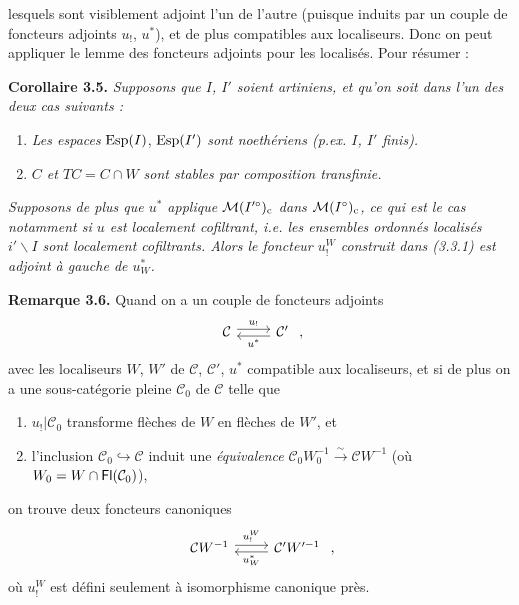 \dgrchunkbegin

lesquels sont visiblement adjoint l'un de l'autre (puisque induits par un couple de foncteurs %
adjoints $u_!$, $u^*$), et de plus compatibles aux localiseurs. Donc on peut appliquer le lemme des foncteurs adjoints pour les localisés. Pour résumer :

\textbf{Corollaire 3.5.} \textit{Supposons que $I$, $I'$ soient artiniens, et qu'on soit dans l'un des deux cas suivants :}
\begin{enumerate}
\item[a)] \textit{Les espaces} $\operatorname{Esp}(I)$, $\operatorname{Esp}(I')$ \textit{sont noethériens (p.ex. $I$, $I'$ finis).}
\item[b)] \textit{$C$ et $TC = C\cap W$ sont stables par composition transfinie.}
\end{enumerate}
\textit{Supposons de plus que $u^*$ applique $\mathcal{M}(I'^\circ)_{\mathrm{c}}$ dans $\mathcal{M}(I^\circ)_{\mathrm{c}}$, ce qui est le cas notamment si $u$ est localement cofiltrant, i.e. les ensembles ordonnés localisés $i'\backslash I$ sont localement cofiltrants. Alors le foncteur $u_!^W$ construit dans (3.3.1) est adjoint à gauche de $u_W^*$.}

\textbf{Remarque 3.6.} Quand on a un couple de foncteurs adjoints
\[
\begin{tikzcd}
\mathcal{C} \arrow[r, shift left, "u_!"] & \mathcal{C}' \arrow[l, shift left, "u^*"]
\end{tikzcd}
\ ,
\]
avec les localiseurs $W$, $W'$ de $\mathcal{C}$, $\mathcal{C}'$, $u^*$ compatible aux localiseurs, et si de plus on a une sous-catégorie pleine $\mathcal{C}_0$ de $\mathcal{C}$ telle que
\begin{enumerate}
\item[a)] $u_!|\mathcal{C}_0$ transforme flèches de $W$ en flèches de $W'$, et
\item[b)] l'inclusion $\mathcal{C}_0 \hookrightarrow \mathcal{C}$ induit une \textit{équivalence} $\mathcal{C}_0W_0^{-1} \xrightarrow{\sim} \mathcal{C}W^{-1}$ (où $W_0 = W\cap\mathsf{Fl}(\mathcal{C}_0)$),
\end{enumerate}
on trouve deux foncteurs canoniques
\[
\begin{tikzcd}
\mathcal{C}W^{-1} \arrow[r, shift left, "u_!^W"] & \mathcal{C}'W'^{-1} \arrow[l, shift left, "u_W^*"]
\end{tikzcd}
\ ,
\]
où $u_!^W$ est défini seulement à isomorphisme canonique près.

